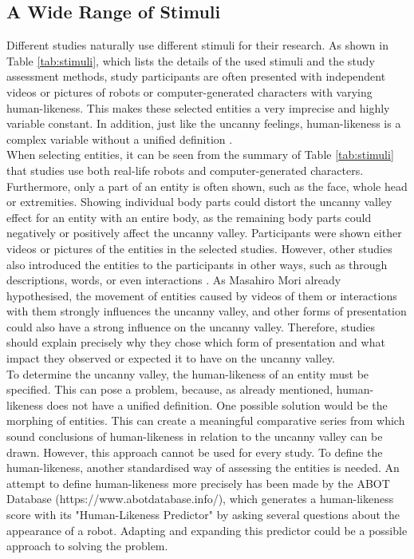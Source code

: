 \subsection{A Wide Range of Stimuli}
Different studies naturally use different stimuli for their research. As shown in Table \ref{tab:stimuli}, which lists the details of the used stimuli and the study assessment methods, study participants are often presented with independent videos or pictures of robots or computer-generated characters with varying human-likeness. This makes these selected entities a very imprecise and highly variable constant. In addition, just like the uncanny feelings, human-likeness is a complex variable without a unified definition \cite{quant_review}.\\
When selecting entities, it can be seen from the summary of Table \ref{tab:stimuli} that studies use both real-life robots and computer-generated characters. Furthermore, only a part of an entity is often shown, such as the face, whole head or extremities. Showing individual body parts could distort the uncanny valley effect for an entity with an entire body, as the remaining body parts could negatively or positively affect the uncanny valley. Participants were shown either videos or pictures of the entities in the selected studies. However, other studies also introduced the entities to the participants in other ways, such as through descriptions, words, or even interactions \cite{quant_review}. As Masahiro Mori \cite{original_masahiro} already hypothesised, the movement of entities caused by videos of them or interactions with them strongly influences the uncanny valley, and other forms of presentation could also have a strong influence on the uncanny valley. Therefore, studies should explain precisely why they chose which form of presentation and what impact they observed or expected it to have on the uncanny valley.\\
To determine the uncanny valley, the human-likeness of an entity must be specified. This can pose a problem, because, as already mentioned, human-likeness does not have a unified definition.
One possible solution would be the morphing of entities. This can create a meaningful comparative series from which sound conclusions of human-likeness in relation to the uncanny valley can be drawn. However, this approach cannot be used for every study.
To define the human-likeness, another standardised way of assessing the entities is needed.
An attempt to define human-likeness more precisely has been made by the ABOT Database (https://www.abotdatabase.info/), which generates a human-likeness score with its "Human-Likeness Predictor" by asking several questions about the appearance of a robot.
Adapting and expanding this predictor could be a possible approach to solving the problem.

